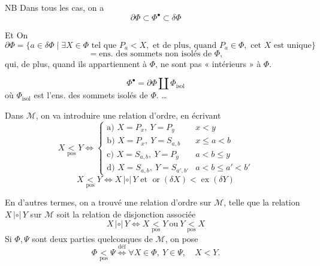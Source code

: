 \documentclass[11pt,a4paper]{article}
\begin{document}
NB Dans tous les cas, on a
\[ \partial\Phi \subset \Phi^{\bullet} \subset \delta\Phi \]

Et \struck{$\Phi^{\bullet}$ \ill{}} On \ill{}
\[ \partial\Phi = \{a\in\delta\Phi \mid \exists X\in\Phi \text{ tel que } P_a<X, \text{ et de plus, quand } P_a\in\Phi, \text{ cet } X \text{ est unique}\} \]
\[ = \text{ens. des sommets non isolés de } \Phi, \]
qui, de plus, quand ils appartiennent à $\Phi$, ne sont pas « intérieurs » à $\Phi$.


\[ \Phi^{\bullet} = \partial\Phi \amalg \Phi_{\mathrm{isol}} \]
où $\Phi_{\mathrm{isol}}$ est l'ens. des  sommets isolés de $\Phi$.
…

Dans $\mathcal{M}$, on va introduire une relation d'ordre, en écrivant
\[ X \underset{\mathrm{pos}}{<} Y \iff
\begin{cases}
\text{a) } X=P_x,\ Y=P_y & x<y \\
\text{b) } X=P_x,\ Y=S_{a,b} & x\leq a<b \\
\text{c) } X=S_{a,b},\ Y=P_y & a<b\leq y \\
\text{d) } X=S_{a,b},\ Y=S_{a',b'} & a<b\leq a'<b'
\end{cases} \]
\[ X \underset{\mathrm{pos}}{<} Y \iff X\,|{\circ}|\,Y \text{ et } \operatorname{or}(\delta X) < \operatorname{ex}(\delta Y) \]


En d'autres termes, on a trouvé une relation d'ordre sur $\mathcal{M}$, telle que la relation $X\,|{\circ}|\,Y$ sur $\mathcal{M}$ soit la relation de disjonction \struck{\ill{}} associée
\[ X\,|{\circ}|\,Y \iff X \underset{\mathrm{pos}}{<} Y \ \text{ou}\ Y \underset{\mathrm{pos}}{<} X \]
Si $\Phi,\Psi$ sont deux parties quelconques de $\mathcal{M}$, on pose
\[ \Phi \underset{\mathrm{pos}}{<} \Psi \overset{\text{déf}}{\iff} \forall X\in\Phi,\ Y\in\Psi,\quad X<Y . \]
\end{document}
